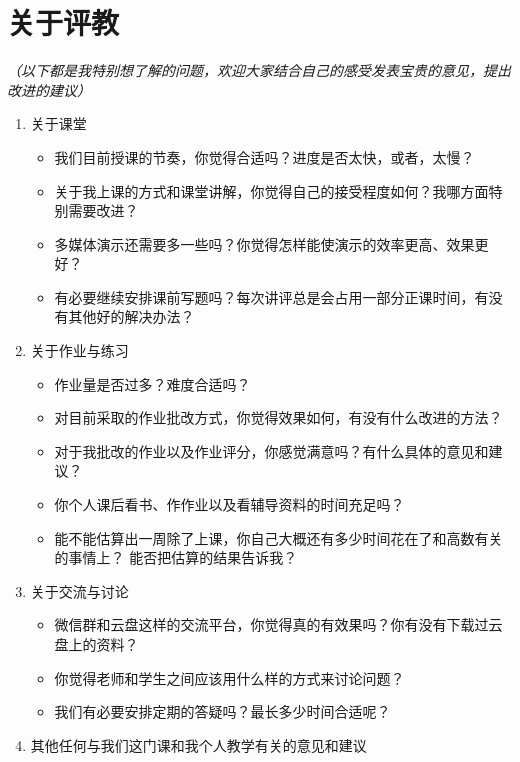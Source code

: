 \newpage

\ifvisible

\section*{关于评教}

{\it （以下都是我特别想了解的问题，欢迎大家结合自己的感受发表宝贵的意见，提出改进的建议）}

\begin{enumerate}
  \item 关于课堂
  \begin{itemize}
    \item 我们目前授课的节奏，你觉得合适吗？进度是否太快，或者，太慢？
    \item 关于我上课的方式和课堂讲解，你觉得自己的接受程度如何？我哪方面特别需要改进？
    \item 多媒体演示还需要多一些吗？你觉得怎样能使演示的效率更高、效果更好？ 
    \item 有必要继续安排课前写题吗？每次讲评总是会占用一部分正课时间，有没有其他好的解决办法？
  \end{itemize}
  \item 关于作业与练习
  \begin{itemize}
    \item 作业量是否过多？难度合适吗？
    \item 对目前采取的作业批改方式，你觉得效果如何，有没有什么改进的方法？
    \item 对于我批改的作业以及作业评分，你感觉满意吗？有什么具体的意见和建议？
    \item 你个人课后看书、作作业以及看辅导资料的时间充足吗？
    \item 能不能估算出一周除了上课，你自己大概还有多少时间花在了和高数有关的事情上？
    能否把估算的结果告诉我？
  \end{itemize}
  \item 关于交流与讨论
  \begin{itemize}
    \item 微信群和云盘这样的交流平台，你觉得真的有效果吗？你有没有下载过云盘上的资料？
    \item 你觉得老师和学生之间应该用什么样的方式来讨论问题？
    \item 我们有必要安排定期的答疑吗？最长多少时间合适呢？
  \end{itemize}
  \item 其他任何与我们这门课和我个人教学有关的意见和建议
\end{enumerate}

\fi

% 
% 



